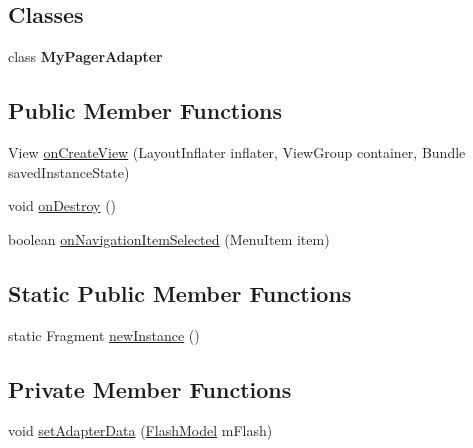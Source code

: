 \subsection*{Classes}
\begin{DoxyCompactItemize}
\item 
class {\bfseries My\+Pager\+Adapter}
\end{DoxyCompactItemize}
\subsection*{Public Member Functions}
\begin{DoxyCompactItemize}
\item 
View \hyperlink{classorg_1_1buildmlearn_1_1toolkit_1_1flashcardtemplate_1_1fragment_1_1MainFragment_a929e6c8011773224f904a1f32bf022ef}{on\+Create\+View} (Layout\+Inflater inflater, View\+Group container, Bundle saved\+Instance\+State)
\item 
void \hyperlink{classorg_1_1buildmlearn_1_1toolkit_1_1flashcardtemplate_1_1fragment_1_1MainFragment_a78b8d3842bc09c8a0b28c07de2accf33}{on\+Destroy} ()
\item 
boolean \hyperlink{classorg_1_1buildmlearn_1_1toolkit_1_1flashcardtemplate_1_1fragment_1_1MainFragment_a87fe1078a49d220035ab75f217d6521c}{on\+Navigation\+Item\+Selected} (Menu\+Item item)
\end{DoxyCompactItemize}
\subsection*{Static Public Member Functions}
\begin{DoxyCompactItemize}
\item 
static Fragment \hyperlink{classorg_1_1buildmlearn_1_1toolkit_1_1flashcardtemplate_1_1fragment_1_1MainFragment_a3f6d32278660ee26b8d3360cab94020d}{new\+Instance} ()
\end{DoxyCompactItemize}
\subsection*{Private Member Functions}
\begin{DoxyCompactItemize}
\item 
void \hyperlink{classorg_1_1buildmlearn_1_1toolkit_1_1flashcardtemplate_1_1fragment_1_1MainFragment_a370e6a6c5447c9b597042b304518d43c}{set\+Adapter\+Data} (\hyperlink{classorg_1_1buildmlearn_1_1toolkit_1_1flashcardtemplate_1_1data_1_1FlashModel}{Flash\+Model} m\+Flash)
\end{DoxyCompactItemize}
